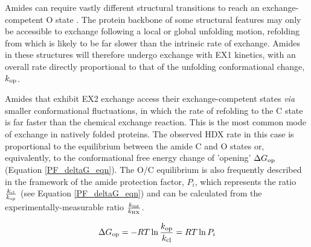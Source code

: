 \documentclass[9pt,tutorial,ASAPversion]{livecoms}
\begin{document}
Amides can require vastly different structural transitions to reach an exchange-competent O state \cite{Hvidt1966, Englander1983, Skinner2012mechanisms, Skinner2012models}. 
The protein backbone of some structural features may only be accessible to exchange following a local or global unfolding motion, refolding from which is likely to be far slower than the intrinsic rate of exchange.
Amides in these structures will therefore undergo exchange with EX1 kinetics, with an overall rate directly proportional to that of the unfolding conformational change, $k_\textnormal{op}$.

Amides that exhibit EX2 exchange access their exchange-competent states \textit{via} smaller conformational fluctuations, in which the rate of refolding to the C state is far faster than the chemical exchange reaction.
This is the most common mode of exchange in natively folded proteins.  
The observed HDX rate in this case is proportional to the equilibrium between the amide C and O states or, equivalently, to the conformational free energy change of 'opening' $\Delta G_{\textnormal{op}}$ (Equation \ref{PF_deltaG_eqn}).
The O/C equilibrium is also frequently described in the framework of the amide protection factor, $P_i$, which represents the ratio $\frac{k_\textnormal{cl}}{k_\textnormal{op}}$ (see Equation \ref{PF_deltaG_eqn}) and can be calculated from the experimentally-measurable ratio $\frac{k_\textnormal{int}}{k_\textnormal{HX}}$.

\begin{equation}\label{PF_deltaG_eqn}
{\Delta}G_{\textnormal{op}} = -RT\ln{\frac{k_{\textnormal{op}}}{k_{\textnormal{cl}}}} = RT\ln{P_i}
\end{equation}
\end{document}
